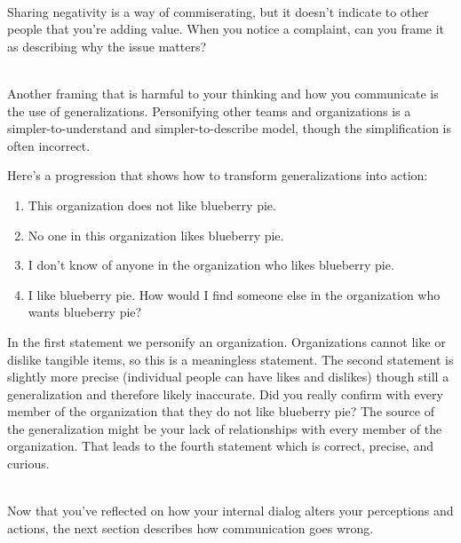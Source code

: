 \ \\
Sharing negativity is a way of commiserating, but it doesn't indicate to other people that you're adding value.  
When you notice a complaint, can you frame it as describing why the issue matters? 

\ \\

Another framing that is harmful to your thinking and how you communicate is the use of generalizations. Personifying other teams and organizations is a simpler-to-understand and simpler-to-describe model, though the simplification is often incorrect. 

Here's a progression that shows how to transform generalizations into action: 
\begin{enumerate}
    \item This organization does not like blueberry pie.
    \item No one in this organization likes blueberry pie.
    \item I don't know of anyone in the organization who likes blueberry pie.
    \item I like blueberry pie. How would I find someone else in the organization who wants blueberry pie?
\end{enumerate}
In the first statement we personify an organization. Organizations cannot like or dislike tangible items, so this is a meaningless statement. The second statement is slightly more precise (individual people can have likes and dislikes) though still a generalization and therefore likely inaccurate. Did you really confirm with every member of the organization that they do not like blueberry pie? The source of the generalization might be your lack of relationships with every member of the organization. That leads to the fourth statement which is correct, precise, and curious. 

\ \\

Now that you've reflected on how your internal dialog alters your perceptions and actions, the next section describes how communication goes wrong.